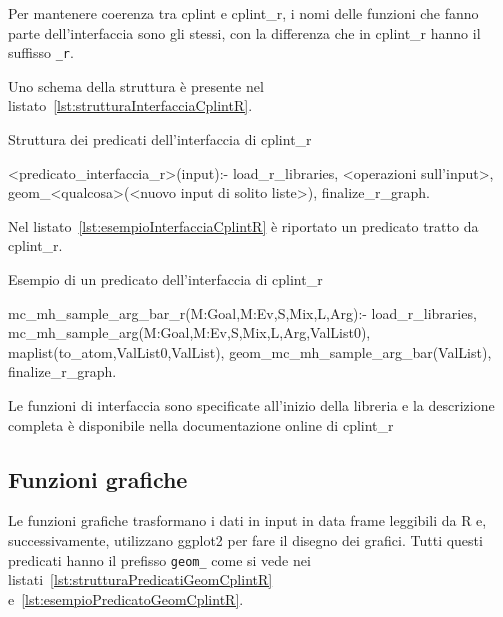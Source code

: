 \documentclass[10pt,titlepage,twoside,a4paper]{report}
\newenvironment{code}{\singlespacing\captionsetup{type=listing}}{}
\begin{document}
Per mantenere coerenza tra cplint e cplint\_r, i nomi delle funzioni che fanno 
parte dell'interfaccia sono gli stessi, con la differenza che in cplint\_r
hanno il suffisso \texttt{\_r}.

Uno schema della struttura è presente nel 
listato~\ref{lst:strutturaInterfacciaCplintR}.

\begin{minipage}{\textwidth}
\centering
\begin{code}
    \caption{Struttura dei predicati dell'interfaccia di cplint\_r}
    \label{lst:strutturaInterfacciaCplintR}
    \begin{prologcode*}{}
<predicato_interfaccia_r>(input):-
    load_r_libraries,
    <operazioni sull'input>,
    geom_<qualcosa>(<nuovo input di solito liste>),
    finalize_r_graph.
    \end{prologcode*}
\end{code}
\end{minipage}

Nel listato~\ref{lst:esempioInterfacciaCplintR} è riportato un predicato
tratto da cplint\_r.

\begin{minipage}{\textwidth}
\centering
\begin{code}
    \caption{Esempio di un predicato dell'interfaccia di cplint\_r}
    \label{lst:esempioInterfacciaCplintR}
    \begin{prologcode*}{}
mc_mh_sample_arg_bar_r(M:Goal,M:Ev,S,Mix,L,Arg):-
    load_r_libraries,
    mc_mh_sample_arg(M:Goal,M:Ev,S,Mix,L,Arg,ValList0),
    maplist(to_atom,ValList0,ValList),
    geom_mc_mh_sample_arg_bar(ValList),
    finalize_r_graph.
    \end{prologcode*}
\end{code}
\end{minipage}

Le funzioni di interfaccia sono specificate all'inizio della libreria e la 
descrizione completa è disponibile nella documentazione online di 
cplint\_r~\cite{cplintRInterface}

\subsection{Funzioni grafiche}
Le funzioni grafiche trasformano i dati in input in data frame leggibili da R 
e, successivamente, utilizzano ggplot2 per fare il disegno dei grafici. Tutti
questi predicati hanno il prefisso \texttt{geom\_} come si vede nei 
listati~\ref{lst:strutturaPredicatiGeomCplintR}
e~\ref{lst:esempioPredicatoGeomCplintR}.
\end{document}
